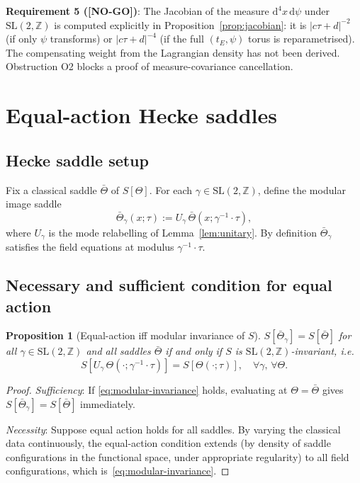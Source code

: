 \documentclass[12pt,a4paper]{article}
\newtheorem{proposition}[theorem]{Proposition}
\theoremstyle{definition}
\theoremstyle{remark}
\newcommand{\NOGO}{\textcolor{red!80!black}{\textbf{[NO-GO]}}}
\newcommand{\SL}{\mathrm{SL}}
\newcommand{\ZZ}{\mathbb{Z}}
\newcommand{\dd}{\mathrm{d}}
\begin{document}
\begin{resultbox}
\textbf{Requirement 5 (\NOGO)}: The Jacobian of the measure $\dd^4x\,\dd\psi$
under $\SL(2,\ZZ)$ is computed explicitly in
Proposition~\ref{prop:jacobian}: it is $|c\tau+d|^{-2}$ (if only $\psi$
transforms) or $|c\tau+d|^{-4}$ (if the full $(t_E,\psi)$ torus is reparametrised).
The compensating weight from the Lagrangian density has not been derived.
Obstruction O2 blocks a proof of measure-covariance cancellation.
\end{resultbox}

\section{Equal-action Hecke saddles}
\label{sec:hecke}

\subsection{Hecke saddle setup}

Fix a classical saddle $\bar\Theta$ of $S[\Theta]$.  For each
$\gamma\in\SL(2,\ZZ)$, define the modular image saddle
\begin{equation}
  \bar\Theta_\gamma(x;\tau) := U_\gamma\,\bar\Theta(x;\gamma^{-1}\cdot\tau),
\end{equation}
where $U_\gamma$ is the mode relabelling of Lemma~\ref{lem:unitary}.
By definition $\bar\Theta_\gamma$ satisfies the field equations at modulus
$\gamma^{-1}\cdot\tau$.

\subsection{Necessary and sufficient condition for equal action}

\begin{proposition}[Equal-action iff modular invariance of $S$]
\label{prop:equal-action-condition}
$S[\bar\Theta_\gamma]=S[\bar\Theta]$ for all $\gamma\in\SL(2,\ZZ)$ and all
saddles $\bar\Theta$ if and only if $S$ is $\SL(2,\ZZ)$-invariant, i.e.
\begin{equation}
  S[U_\gamma\,\Theta(\cdot;\gamma^{-1}\cdot\tau)]
  = S[\Theta(\cdot;\tau)],\quad\forall\gamma,\,\forall\Theta.
  \label{eq:modular-invariance}
\end{equation}
\end{proposition}
\begin{proof}
\emph{Sufficiency}: If \eqref{eq:modular-invariance} holds, evaluating at
$\Theta=\bar\Theta$ gives $S[\bar\Theta_\gamma]=S[\bar\Theta]$ immediately.

\emph{Necessity}: Suppose equal action holds for all saddles.  By varying
the classical data continuously, the equal-action condition extends (by
density of saddle configurations in the functional space, under appropriate
regularity) to all field configurations, which is~\eqref{eq:modular-invariance}.
\qedhere
\end{proof}
\end{document}
